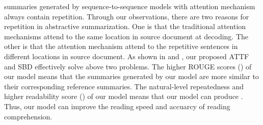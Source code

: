 \DIFdelbegin {}\DIFdelend \DIFaddbegin {}\DIFaddend summaries generated by sequence-to-sequence models with attention mechanism always contain repetition.  
Through our observations, there are two reasons for repetition in abstractive summarization.
One is that the traditional attention mechanisms attend to the same location in source document at decoding.
The other is that the attention mechanism attend to the repetitive sentences in different locations in source document. 
As shown in  and ,
our proposed ATTF and SBD effectively solve above two problems.  
The higher ROUGE scores () of our model means that
the summaries generated by our model are more similar to their corresponding reference summaries.
The natural-level repeatedness and higher readability score () of our model means 
that our model can produce \DIFdelbegin {}\DIFdelend \DIFaddbegin {}\DIFaddend .
Thus, our model can improve the reading speed and accuarcy of reading comprehension.


